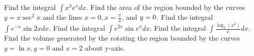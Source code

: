 \documentclass[
  course = {{MATH102 Calculus II}},
  quartile = {{2}},
  assignment = {{Section: 7.1}},%
  topic = {{Integration by Parts}},
  firstexercise = 1,
  term = 203
]{../class/aga-homework}
\begin{document}
\fbox{
\begin{minipage}{\textwidth}



\[
\displaystyle
\int udv = uv - \int v du
\]

\[
\displaystyle
\int_a^b udv = \left. uv\right|_a^b - \int_a^b v du
\]
\end{minipage}
}

\newpage

\problem Find the integral $\displaystyle \int x^3e^x dx $.
\newpage
\problem Find the area of the region bounded by the curves $\displaystyle y=x\sec^2x $ and the lines $x=0, x=\frac{\pi}{4}$, and $y=0\nobreak$.
\newpage
\problem Find the integral $\displaystyle \int e^{-x}\sin 2x dx $.
\newpage
\problem Find the integral $\displaystyle \int e^{2x}\sin e^{x} dx $.
\newpage
\problem Find the integral $\displaystyle \int \frac{\log_3(x^2)}{x} dx $.
\newpage
\problem Find the volume generated by the rotating the region bounded by the curves $y=\ln x, y=0$ and $x=2$ about y-axis.

\afterpage{\null\newpage}

\afterpage{\null\newpage}

\afterpage{\null\newpage}
\end{document}
